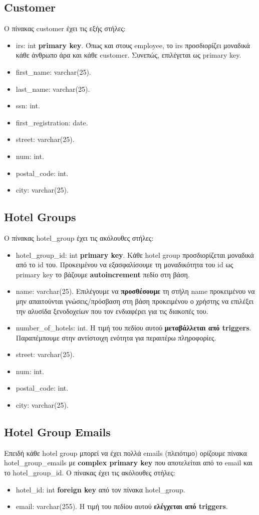 \documentclass[a4paper,oneside, 11pt]{article}
\begin{document}
\subsection{Customer}
O πίνακας customer έχει τις εξής στήλες:
\begin{itemize}
\item irs: int \textbf{primary key}. Όπως και στους employee, το irs προσδιορίζει μοναδικά κάθε άνθρωπο άρα και κάθε customer. Συνεπώς, επιλέγεται ως primary key.
\item first\_name: varchar(25).
\item last\_name: varchar(25).
\item ssn: int.
\item first\_registration: date.
\item street: varchar(25).
\item num: int.
\item postal\_code: int.
\item city: varchar(25).
\end{itemize}
\subsection{Hotel Groups}
Ο πίνακας hotel\_group έχει τις ακόλουθες στήλες:
\begin{itemize}
\item hotel\_group\_id: int \textbf{primary key}. Κάθε hotel group προσδιορίζεται μοναδικά από το id του. Προκειμένου να εξασφαλίσουμε τη μοναδικότητα του id ως primary key το βάζουμε \textbf{autoincrement} πεδίο στη βάση.
\item name: varchar(25). Επιλέγουμε να \textbf{προσθέσουμε} τη στήλη name προκειμένου να μην απαιτούνται γνώσεις/πρόσβαση στη βάση προκειμένου ο χρήστης να επιλέξει την αλυσίδα ξενοδοχείων που τον ενδιαφέρει για τις διακοπές του.
\item number\_of\_hotels: int. Η τιμή του πεδίου αυτού \textbf{μεταβάλλεται από triggers}. Παραπέμπουμε στην αντίστοιχη ενότητα για περαιτέρω πληροφορίες.
\item street: varchar(25).
\item num: int.
\item postal\_code: int.
\item city: varchar(25).
\end{itemize}



\subsection{Hotel Group Emails}
Επειδή κάθε hotel group μπορεί να έχει πολλά emails (πλειότιμο) ορίζουμε πίνακα hotel\_group\_emails με \textbf{complex primary key} που αποτελείται από το email και το hotel\_group\_id. Ο πίνακας έχει τις ακόλουθες στήλες:
\begin{itemize}
\item hotel\_id: int \textbf{foreign key} από τον πίνακα hotel\_group.
\item email: varchar(255). Η τιμή του πεδίου αυτού \textbf{ελέγχεται από triggers}.
\end{itemize}
\end{document}
